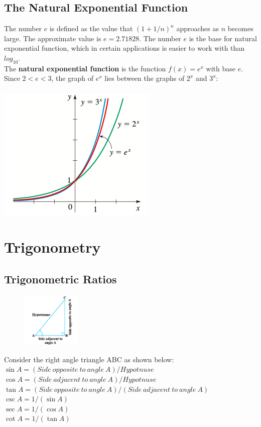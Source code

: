 \documentclass{book}
\begin{document}
	 \section{The Natural Exponential Function}
	 The number $e$ is defined as the value that $(1+1/n)^n$ approaches as $n$ becomes large. The approximate value is $e = 2.71828$. The number $e$ is the base for natural exponential function, which in certain applications is easier to work with than $log_{10}$. \\
	 The \textbf{natural exponential function} is the function $f(x) = e^x$ with base $e$. Since $2 < e < 3$, the graph of $e^x$ lies between the graphs of $2^x$ and $3^x$:\\
	 \\
	 \includegraphics[scale=0.8]{exp4}
	 
	\chapter{Trigonometry}
	\section{Trigonometric Ratios}
	 \begin{figure}
	 	\includegraphics[scale=0.9,width=0.25\textwidth]{rat1}
	 \end{figure}
	Consider the right angle triangle ABC as shown below: \\
	 $\sin A = (Side \: opposite \:  to \: angle \: A) / Hypotnuse$ \\
	 $\cos A =(Side \: adjacent \: to \: angle \: A) / Hypotnuse$ \\
	 $\tan A = (Side \: opposite \: to \: angle \: A) / (Side \: adjacent\: to\: angle\: A)$ \\
	 $\csc A = 1 / (\sin A)$ \\
	 $\sec A = 1/(\cos A)$ \\
	 $\cot A = 1/(\tan A)$ \\
\end{document}
